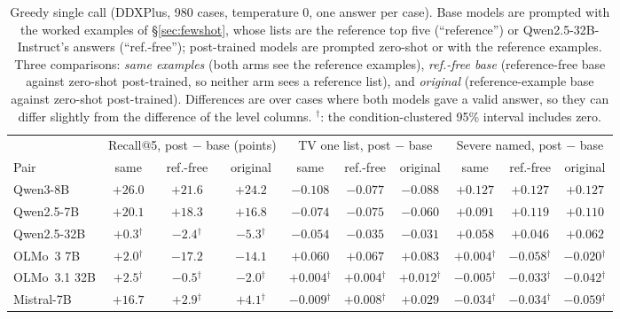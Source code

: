 \documentclass[wcp]{jmlr}
\begin{document}
\begin{table}[t]
\medskip
\begin{adjustbox}{max width=\linewidth}
\begin{tabular}{lccccccccc}
\toprule
 & \multicolumn{3}{c}{Recall@5, post $-$ base (points)} & \multicolumn{3}{c}{TV one list, post $-$ base} & \multicolumn{3}{c}{Severe named, post $-$ base} \\
Pair & same & ref.-free & original & same & ref.-free & original & same & ref.-free & original \\
\midrule
Qwen3-8B & $+26.0$ & $+21.6$ & $+24.2$ & $-0.108$ & $-0.077$ & $-0.088$ & $+0.127$ & $+0.127$ & $+0.127$ \\
Qwen2.5-7B & $+20.1$ & $+18.3$ & $+16.8$ & $-0.074$ & $-0.075$ & $-0.060$ & $+0.091$ & $+0.119$ & $+0.110$ \\
Qwen2.5-32B & $+0.3$$^{\dagger}$ & $-2.4$$^{\dagger}$ & $-5.3$$^{\dagger}$ & $-0.054$ & $-0.035$ & $-0.031$ & $+0.058$ & $+0.046$ & $+0.062$ \\
OLMo~3 7B & $+2.0$$^{\dagger}$ & $-17.2$ & $-14.1$ & $+0.060$ & $+0.067$ & $+0.083$ & $+0.004$$^{\dagger}$ & $-0.058$$^{\dagger}$ & $-0.020$$^{\dagger}$ \\
OLMo~3.1 32B & $+2.5$$^{\dagger}$ & $-0.5$$^{\dagger}$ & $-2.0$$^{\dagger}$ & $+0.004$$^{\dagger}$ & $+0.004$$^{\dagger}$ & $+0.012$$^{\dagger}$ & $-0.005$$^{\dagger}$ & $-0.033$$^{\dagger}$ & $-0.042$$^{\dagger}$ \\
Mistral-7B & $+16.7$ & $+2.9$$^{\dagger}$ & $+4.1$$^{\dagger}$ & $-0.009$$^{\dagger}$ & $+0.008$$^{\dagger}$ & $+0.029$ & $-0.034$$^{\dagger}$ & $-0.034$$^{\dagger}$ & $-0.059$$^{\dagger}$ \\
\bottomrule
\end{tabular}
\end{adjustbox}
\caption{Greedy single call (DDXPlus, 980 cases, temperature 0, one answer per case). Base models are prompted with the worked examples of \S\ref{sec:fewshot}, whose lists are the reference top five (``reference'') or Qwen2.5-32B-Instruct's answers (``ref.-free''); post-trained models are prompted zero-shot or with the reference examples. Three comparisons: \emph{same examples} (both arms see the reference examples), \emph{ref.-free base} (reference-free base against zero-shot post-trained, so neither arm sees a reference list), and \emph{original} (reference-example base against zero-shot post-trained). Differences are over cases where both models gave a valid answer, so they can differ slightly from the difference of the level columns. $^{\dagger}$: the condition-clustered 95\% interval includes zero.}
\label{tab:greedy}
\end{table}
\end{document}

